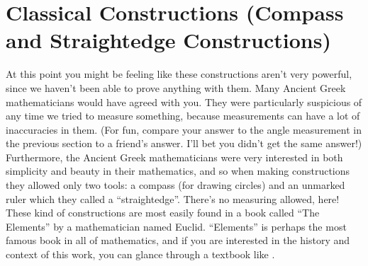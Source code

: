 \documentclass{ximera}
\begin{document}
\section{Classical Constructions (Compass and Straightedge Constructions)}

At this point you might be feeling like these constructions aren't very powerful, since we haven't been able to prove anything with them. Many Ancient Greek mathematicians would have agreed with you. They were particularly suspicious of any time we tried to measure something, because measurements can have a lot of inaccuracies in them. (For fun, compare your answer to the angle measurement in the previous section to a friend's answer. I'll bet you didn't get the same answer!) Furthermore, the Ancient Greek mathematicians were very interested in both simplicity and beauty in their mathematics, and so when making constructions they allowed only two tools: a compass (for drawing circles) and an unmarked ruler which they called a ``straightedge''. There's no measuring allowed, here! These kind of constructions are most easily found in a book called ``The Elements'' by a mathematician named Euclid. ``Elements'' is perhaps the most famous book in all of mathematics, and if you are interested in the history and context of this work, you can glance through a textbook like . 
\end{document}
